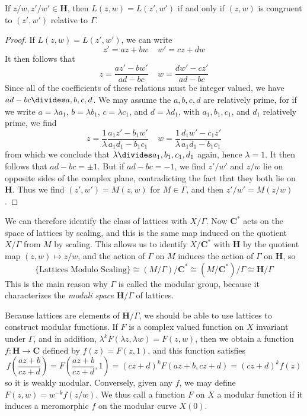 \begin{theorem}
    If $z/w, z'/w' \in \mathbf{H}$, then $L(z,w) = L(z',w')$ if and only if $(z,w)$ is congruent to $(z',w')$ relative to $\Gamma$.
\end{theorem}
\begin{proof}
    If $L(z,w) = L(z',w')$, we can write
    \[ z' = az + bw\ \ \ \ \ w' = cz + dw \]
    It then follows that
    \[ z = \frac{az' - bw'}{ad - bc}\ \ \ \ \ w = \frac{dw' - cz'}{ad-bc} \]
    Since all of the coefficients of these relations must be integer valued, we have $ad - bc \divides a,b,c,d$. We may assume the $a,b,c,d$ are relatively prime, for if we write $a = \lambda a_1$, $b = \lambda b_1$, $c = \lambda c_1$, and $d = \lambda d_1$, with $a_1, b_1, c_1$, and $d_1$ relatively prime, we find
    \[ z = \frac{1}{\lambda} \frac{a_1 z' - b_1 w'}{a_1 d_1 - b_1 c_1} \ \ \ \ \ w =  \frac{1}{\lambda} \frac{d_1 w' - c_1 z'}{a_1 d_1 - b_1 c_1} \]
    from which we conclude that $\lambda \divides a_1, b_1, c_1, d_1$ again, hence $\lambda = 1$. It then follows that $ad - bc = \pm 1$. But if $ad - bc = -1$, we find $z'/w'$ and $z/w$ lie on opposite sides of the complex plane, contradicting the fact that they both lie on $\mathbf{H}$. Thus we find $(z',w') = M(z,w)$ for $M \in \Gamma$, and then $z'/w' = M(z/w)$.
\end{proof}

We can therefore identify the class of lattices with $X/\Gamma$. Now $\mathbf{C}^*$ acts on the space of lattices by scaling, and this is the same map induced on the quotient $X/\Gamma$ from $M$ by scaling. This allows us to identify $X/\mathbf{C}^*$ with $\mathbf{H}$ by the quotient map $(z,w) \mapsto z/w$, and the action of $\Gamma$ on $M$ induces the action of $\Gamma$ on $\mathbf{H}$, so
%
\[ \{ \text{Lattices Modulo Scaling} \} \cong (M/\Gamma)/\mathbf{C}^* \cong (M/\mathbf{C}^*)/\Gamma \cong \mathbf{H}/\Gamma \]
%
This is the main reason why $\Gamma$ is called the modular group, because it characterizes the {\it moduli space} $\mathbf{H}/\Gamma$ of lattices.

Because lattices are elements of $\mathbf{H}/\Gamma$, we should be able to use lattices to construct modular functions. If $F$ is a complex valued function on $X$ invariant under $\Gamma$, and in addition, $\lambda^k F(\lambda z, \lambda w) = F(z,w)$, then we obtain a function $f: \mathbf{H} \to \mathbf{C}$ defined by $f(z) = F(z,1)$, and this function satisfies
%
\[ f \left( \frac{az + b}{cz + d} \right) = F \left( \frac{az + b}{cz + d}, 1 \right) = (cz + d)^{k} F(az + b, cz + d) = (cz + d)^{k} f(z) \]
%
so it is weakly modular. Conversely, given any $f$, we may define $F(z,w) = w^{-k} f(z/w)$. We thus call a function $F$ on $X$ a modular function if it induces a meromorphic $f$ on the modular curve $X(0)$.

